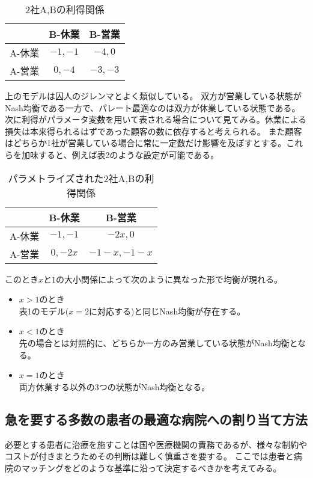 \documentclass[10pt,uplatex]{jsarticle}
\theoremstyle{case}
\begin{document}
    \begin{table}[h]
        \centering
        \begin{tabular}{c|c|c}
             & B-休業 & B-営業\\\hline
            A-休業 & $-1, -1$ & $-4,0$\\ \hline
            A-営業 & $0,-4$ & $-3,-3$\\
        \end{tabular}
        \caption{2社A,Bの利得関係}
    \end{table}

    上のモデルは囚人のジレンマとよく類似している。
    双方が営業している状態がNash均衡である一方で、パレート最適なのは双方が休業している状態である。\\

    次に利得がパラメータ変数を用いて表される場合について見てみる。休業による損失は本来得られるはずであった顧客の数に依存すると考えられる。
    また顧客はどちらか1社が営業している場合に常に一定数だけ影響を及ぼすとする。これらを加味すると、例えば表2のような設定が可能である。

    \begin{table}[h]
        \centering
        \begin{tabular}{c|c|c}
            & B-休業 & B-営業\\\hline
            A-休業 & $-1, -1$ & $-2x,0$\\ \hline
            A-営業 & $0,-2x$ & $-1-x,-1-x$\\
        \end{tabular}
        \caption{パラメトライズされた2社A,Bの利得関係}
    \end{table}

    このとき$x$と$1$の大小関係によって次のように異なった形で均衡が現れる。
    \begin{itemize}
        \item $x>1$のとき\\
        表1のモデル($x=2$に対応する)と同じNash均衡が存在する。
        \item $x<1$のとき\\
        先の場合とは対照的に、どちらか一方のみ営業している状態がNash均衡となる。
        \item $x=1$のとき\\
        両方休業する以外の3つの状態がNash均衡となる。
    \end{itemize}

    \subsection{急を要する多数の患者の最適な病院への割り当て方法}
    必要とする患者に治療を施すことは国や医療機関の責務であるが、様々な制約やコストが付きまとうためその判断は難しく慎重さを要する。
    ここでは患者と病院のマッチングをどのような基準に沿って決定するべきかを考えてみる。\\
\end{document}
